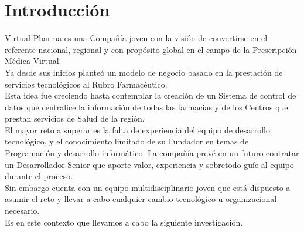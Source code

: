 \section*{Introducción}\label{sec:Introducción}

Virtual Pharma es una Compañía joven con la visión  de convertirse en el referente nacional, regional y con propósito global en el campo de la Prescripción Médica Virtual. 
\\
Ya desde sus inicios planteó un modelo de negocio basado en la prestación de servicios tecnológicos al Rubro Farmacéutico.
\\
Esta idea fue creciendo hasta contemplar la creación de un Sistema de control de datos que centralice la información de todas las farmacias y de los Centros que prestan servicios de Salud de la región.
\\
El mayor reto a superar es la falta de experiencia del equipo de desarrollo tecnológico, y el conocimiento limitado de su Fundador en temas de Programación y desarrollo informático. La compañía prevé en un futuro contratar un Desarrollador Senior que aporte valor, experiencia y sobretodo guíe al equipo durante el proceso.
\\
Sin embargo cuenta con un equipo multidisciplinario joven que está dispuesto a asumir el reto y llevar a cabo cualquier cambio tecnológico u organizacional necesario.
\\
Es en este contexto que llevamos a cabo la siguiente investigación.
\nocite{Alfonso2010a}